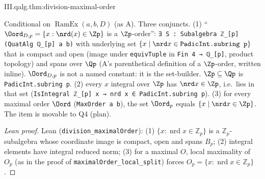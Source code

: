 \begin{tfformal}{III.qalg.thm:division-maximal-order}
\begin{tffidelity}
Conditional on $\operatorname{RamEx}(a,b,D)$ (as A). Three conjuncts. (1) ``$\Oord_{D,p}=\{x:\nrd(x)\in\Zp\}$ is a $\Zp$-order'': \texttt{∃ S : Subalgebra ℤ\_[p] (QuatAlg ℚ\_[p] a b)} with underlying set $\{x\mid\nrd x\in\texttt{PadicInt.subring p}\}$ that is compact and open (image under \texttt{equivTuple} in \texttt{Fin 4 → ℚ\_[p]}, product topology) and spans over $\Qp$ (A's parenthetical definition of a $\Zp$-order, written inline). $\Oord_{D,p}$ is not a named constant: it is the set-builder. $\Zp\subseteq\Qp$ is \texttt{PadicInt.subring p}. (2) every $x$ integral over $\Zp$ has $\nrd x\in\Zp$, i.e.\ lies in that set (\texttt{IsIntegral ℤ\_[p] x → nrd x ∈ PadicInt.subring p}). (3) for every maximal order $\Oord$ (\texttt{MaxOrder a b}), the set $\Oord_p$ equals $\{x\mid\nrd x\in\Zp\}$. The item is movable to Q4 (plan).
\end{tffidelity}
\end{tfformal}
\begin{proof}[Lean proof]
Lean (\texttt{division\_maximalOrder}): (1) $\{x:\operatorname{nrd}x\in\mathbb{Z}_p\}$ is a $\mathbb{Z}_p$-subalgebra whose coordinate image is compact, open and spans $B_p$; (2) integral elements have integral reduced norm; (3) for a maximal $O$, local maximality of $O_p$ (as in the proof of \texttt{maximalOrder\_local\_split}) forces $O_p=\{x:\operatorname{nrd}x\in\mathbb{Z}_p\}$.
\end{proof}


